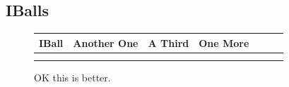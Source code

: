 \subsection{IBalls}

\begin{figure}[H]
  {
    \setlength{\tabcolsep}{1.0pt}
    \setlength\cmidrulewidth{\heavyrulewidth} %
    \begin{adjustbox}{width=14cm,center}
      \begin{tabular}{ccccccc}
        \toprule
        IBall & Another One & A Third & One More & \\
        \midrule
        \midrule
\makecell[l]{
	\begin{subfigure}{0.3\textwidth}
    \def\MULTICOLORONE{gray}
    \def\MULTICOLORTWO{white}
    \def\SPRITECOLOR{black}
		
	\end{subfigure}
} & 
\makecell[l]{
	\begin{subfigure}{0.3\textwidth}
    \def\MULTICOLORONE{gray}
    \def\MULTICOLORTWO{white}
    \def\SPRITECOLOR{black}
		
	\end{subfigure}
} & 
\makecell[l]{
	\begin{subfigure}{0.3\textwidth}
    \def\MULTICOLORONE{gray}
    \def\MULTICOLORTWO{white}
    \def\SPRITECOLOR{black}
		
	\end{subfigure}
} & 
\makecell[l]{
	\begin{subfigure}{0.3\textwidth}
    \def\MULTICOLORONE{gray}
    \def\MULTICOLORTWO{white}
    \def\SPRITECOLOR{black}
		
	\end{subfigure}
} \\ 
        \addlinespace
        \bottomrule
      \end{tabular}
    \end{adjustbox}
  }\caption{OK this is better.}
\end{figure}



